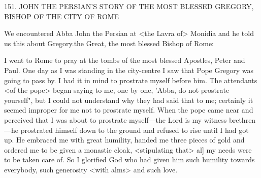 151.
JOHN THE PERSIAN'S STORY OF THE
MOST BLESSED GREGORY,
BISHOP OF THE CITY OF ROME

We encountered Abba John the Persian at <the Lavra of> Monidia
and he told us this about Gregory.the Great, the most blessed
Bishop of Rome:

I went to Rome to pray at the tombs of the most blessed Apostles,
Peter and Paul.
One day as I was standing in the city-centre I saw
that Pope Gregory was going to pass by.
I had it in mind to
prostrate myself before him.
The attendants <of the pope> began
saying to me, one by one, 'Abba, do not prostrate yourself", but I
could not understand why they had said that to me; certainly it
seemed improper for me not to prostrate myself.
When the pope
came near and perceived that I was about to prostrate myself—the
Lord is my witness brethren—he prostrated himself down to the
ground and refused to rise until I had got up.
He embraced me with
great humility, handed me three pieces of gold and ordered me to
be given a monastic cloak, <stipulating that> al] my needs were to
be taken care of.
So I glorified God who had given him such
humility towards everybody, such generosity <with alms> and such
love.

